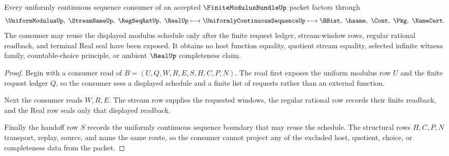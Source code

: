 \begin{theorem}
\label{thm:finite-modulus-bundle-uniform-sequence-handoff}
Every uniformly continuous sequence consumer of an accepted $\FiniteModulusBundleUp$ packet factors through
$$
\UniformModulusUp,\ \StreamNameUp,\ \RegSeqRatUp,\ \RealUp
\longmapsto
\UniformlyContinuousSequenceUp
\longmapsto
\BHist,\ \hsame,\ \Cont,\ \Pkg,\ \NameCert .
$$
The consumer may reuse the displayed modulus schedule only after the finite request ledger, stream-window rows, regular rational readback, and terminal Real seal have been exposed. It obtains no host function equality, quotient stream equality, selected infinite witness family, countable-choice principle, or ambient $\RealUp$ completeness claim.
\end{theorem}
\begin{proof}
Begin with a consumer read of $B=(U,Q,W,R,E,S,H,C,P,N)$. The read first exposes the uniform modulus row $U$ and the finite request ledger $Q$, so the consumer sees a displayed schedule and a finite list of requests rather than an external function.

Next the consumer reads $W,R,E$. The stream row supplies the requested windows, the regular rational row records their finite readback, and the Real row seals only that displayed readback.

Finally the handoff row $S$ records the uniformly continuous sequence boundary that may reuse the schedule. The structural rows $H,C,P,N$ transport, replay, source, and name the same route, so the consumer cannot project any of the excluded host, quotient, choice, or completeness data from the packet.
\end{proof}



